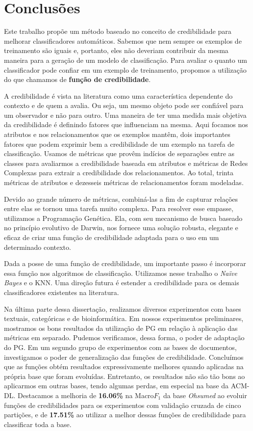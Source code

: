 \chapter{Conclusões}
\label{cap::conclusoes}


Este trabalho propõe um método baseado no conceito de credibilidade para melhorar classificadores automáticos.
Sabemos que nem sempre os exemplos de treinamento são iguais e, portanto, eles não deveriam contribuir da mesma maneira para a geração de um modelo de classificação.
Para avaliar o quanto um classificador pode confiar em um exemplo de treinamento, propomos a utilização do que chamamos de \textbf{função de credibilidade}.

A credibilidade é vista na literatura como uma característica dependente do contexto e de quem a avalia. Ou seja, um mesmo objeto pode ser confiável para um observador e não para outro.
Uma maneira de ter uma medida mais objetiva da credibilidade é definindo fatores que influenciam na mesma.
Aqui focamos nos atributos e nos relacionamentos que os exemplos mantêm, dois importantes fatores que podem exprimir bem a credibilidade de um exemplo na tarefa de classificação.
Usamos de métricas que provêm indícios de separações entre as classes para avaliarmos a credibilidade baseada em atributos e métricas de Redes Complexas para extrair a credibilidade dos relacionamentos. Ao total, trinta métricas de atributos e dezesseis métricas de relacionamentos foram modeladas.

Devido ao grande número de métricas, combiná-las a fim de capturar relações entre elas se tornou uma tarefa muito complexa.
Para resolver esse empasse, utilizamos a Programação Genética. Ela, com seu mecanismo de busca baseado no princípio evolutivo de Darwin, nos fornece uma solução robusta, elegante e eficaz de criar uma função de credibilidade adaptada para o uso em um determinado contexto.

Dada a posse de uma função de credibilidade, um importante passo é incorporar essa função nos algoritmos de classificação. Utilizamos nesse trabalho o \textit{Naïve Bayes} e o \textsc{KNN}. Uma direção futura é estender a credibilidade para os demais classificadores existentes na literatura.

Na última parte dessa dissertação, realizamos diversos experimentos com bases textuais, categóricas e de bioinformática. Em nossos experimentos preliminares, mostramos os bons resultados da utilização de \textsc{PG} em relação à aplicação das métricas em separado. Pudemos verificamos, dessa forma, o poder de adaptação do \textsc{PG}.
Em um segundo grupo de experimentos com as bases de documentos, investigamos o poder de generalização das funções de credibilidade. Concluímos que as funções obtém resultados expressivamente melhores quando aplicadas na própria base que foram evoluídas. Entretanto, os resultados não são tão bons ao aplicarmos em outras bases, tendo algumas perdas, em especial na base da \textsc{ACM-DL}.
Destacamos a melhoria de \textbf{16.06\%} na Macro$F_1$ da base \textit{Ohsumed} ao evoluir funções de credibilidades para os experimentos com validação cruzada de cinco partições, e de
\textbf{17.51\%} ao utilizar a melhor dessas funções de credibilidade para classificar toda a base.


